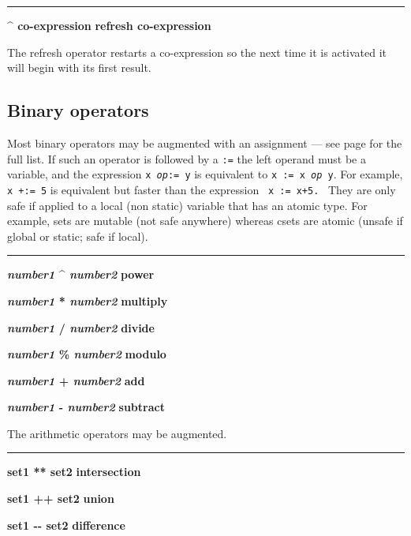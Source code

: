 \bigskip\hrule\vspace{0.1cm}
\noindent
{\bf \^{} co{}-expression } \hfill {\bf refresh co{}-expression}

\noindent
{}The refresh operator restarts a
co-expression so the next time it is activated it will begin with its
first result.

\subsection*{Binary operators}

Most binary operators may be augmented with an
assignment
--- see page \pageref{AugOps} for the full list.
If such an operator is followed
by a \texttt{:=} the left operand must be a variable, and the
expression \texttt{x }\texttt{\textit{op}}\texttt{:= y} is equivalent
to \texttt{x := x }\texttt{\textit{op}}\texttt{ y}. For example,
\texttt{x +:= 5} is equivalent but faster than the expression
\ \texttt{x := x+5.}
 \
They are only safe if applied to a local (non static) variable that
has an atomic type. For example, sets are mutable (not safe anywhere)
whereas csets are atomic (unsafe if global or static; safe if local).

\bigskip\hrule\vspace{0.1cm}
\noindent
{\bf \textit{number1} \^{} \textit{number2} } \hfill {\bf power}
\index{power, exponent \^{}}

\noindent
{\bf \textit{number1} * \textit{number2} } \hfill {\bf multiply}

\noindent
{\bf \textit{number1} / \textit{number2} } \hfill {\bf divide}

\noindent
{\bf \textit{number1} \% \textit{number2} } \hfill {\bf modulo}

\noindent
{\bf \textit{number1} + \textit{number2} } \hfill {\bf add}

\noindent
{\bf \textit{number1} - \textit{number2} } \hfill {\bf subtract}

\noindent
The arithmetic operators may be augmented.

\bigskip\hrule\vspace{0.1cm}
\noindent
{\bf set1 ** set2 } \hfill {\bf intersection}

\noindent
{\bf set1 ++ set2 } \hfill {\bf union}

\noindent
{\bf set1 -{}- set2 } \hfill {\bf difference}

